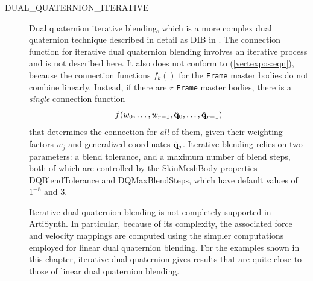 \begin{description}
\item[DUAL\_QUATERNION\_ITERATIVE]\mbox{}

Dual quaternion iterative blending, which is a more complex dual
quaternion technique described in detail as DIB in
\cite{kavan2008geometric}. The connection function for iterative dual
quaternion blending involves an iterative process and is not
described here. It also does not conform to (\ref{vertexpos:eqn}),
because the connection functions $f_k()$ for the {\tt Frame} master
bodies do not combine linearly. Instead, if there
are $r$ {\tt Frame} master bodies, there is a {\it single}
connection function
%
\begin{equation}
f (w_0, \ldots, w_{r-1}, \hat{{\bf q}}_0, \ldots, \hat{{\bf q}}_{r-1})
\end{equation}
%
that determines the connection for {\it all} of them, given their
weighting factors $w_j$ and generalized coordinates $\hat{{\bf q}}_j$.
Iterative blending relies on two parameters: a blend tolerance, and a
maximum number of blend steps, both of which are controlled by the
SkinMeshBody properties {\sf DQBlendTolerance} and {\sf
DQMaxBlendSteps}, which have default values of $1^{-8}$ and $3$.

\begin{sideblock}
Iterative dual quaternion blending is not completely supported in
ArtiSynth. In particular, because of its complexity, the associated
force and velocity mappings are computed using the simpler
computations employed for linear dual quaternion blending.  For the
examples shown in this chapter, iterative dual quaternion gives
results that are quite close to those of linear dual quaternion
blending.
\end{sideblock}

\end{description}

